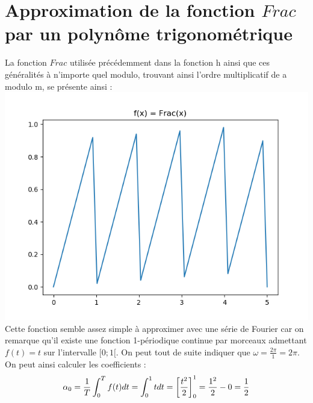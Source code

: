\documentclass{article}
\begin{document}
\section{Approximation de la fonction $Frac$ par un polynôme trigonométrique}
La fonction $Frac$ utilisée précédemment dans la fonction h ainsi que ces généralités à n'importe quel modulo, trouvant ainsi l'ordre multiplicatif de a modulo m, se présente ainsi :\\
\includegraphics{Figure_4.png}\\
Cette fonction semble assez simple à approximer avec une série de Fourier car on remarque qu'il existe une fonction 1-périodique continue par morceaux admettant $f(t) = t$ sur l'intervalle $[0;1[$. On peut tout de suite indiquer que $\omega=\frac{2\pi}{1}=2\pi$. On peut ainsi calculer les coefficients : \\
\begin{equation}
\begin{split}
\alpha_0 & = \frac{1}{T}\int_{0}^{T}f(t)dt = \int_{0}^{1}tdt = \left[\frac{t^2}{2}\right]^1_0 =\frac{1^2}{2}-0=\frac{1}{2}\\\\\notag
\end{split}
\end{equation}
\end{document}
